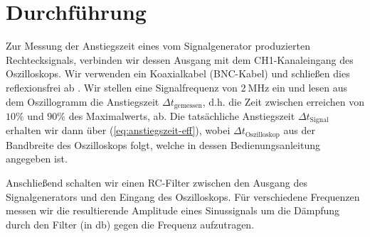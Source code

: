 \documentclass{article}
\newcommand{\defc}{black}
\newcommand{\colorT}[2][blue]{\color{#1}{#2}\color{\defc}}
\newcommand{\todo}[1]{\colorT[red]{\textbf{(#1)}}}
\begin{document}
\endgroup
\section{Durchführung}
Zur Messung der Anstiegszeit eines vom Signalgenerator produzierten Rechtecksignals,
verbinden wir dessen Ausgang mit dem CH1-Kanaleingang des Oszilloskops. Wir verwenden ein Koaxialkabel (BNC-Kabel)
und schließen dies reflexionsfrei ab \todo{Was bedeutet das?}. Wir stellen eine Signalfrequenz von $\SI{2}{\mega\hertz}$ ein
und lesen aus dem Oszillogramm die Anstiegszeit $\Delta t_\text{gemessen}$, d.h. die Zeit zwischen erreichen von $10\%$ und $90\%$
des Maximalwerts, ab. Die tatsächliche Anstiegszeit $\Delta t_\text{Signal}$ erhalten wir dann über (\ref{eq:anstiegszeit-eff}),
wobei $\Delta t_\text{Oszilloskop}$ aus der Bandbreite des Oszilloskops folgt, welche in dessen Bedienungsanleitung angegeben ist.

Anschließend schalten wir einen RC-Filter zwischen den Ausgang des Signalgenerators und den Eingang des Oszilloskops. Für verschiedene
Frequenzen messen wir die resultierende Amplitude eines Sinussignals um die Dämpfung durch den Filter (in \unit{\decibel})
gegen die Frequenz aufzutragen.


\end{document}
